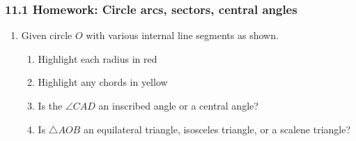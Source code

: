

\fancyhead[LE]{\thepage}



\subsubsection*{11.1 Homework: Circle arcs, sectors, central angles}
\begin{enumerate}
  \item Given circle $O$ with various internal line segments as shown.
  \begin{multicols}{2}
  \raggedcolumns
  \begin{enumerate}[itemsep=0.5cm]
    \item Highlight each radius in red
    \item Highlight any chords in yellow
    \item Is the $\angle CAD$ an inscribed angle or a central angle?
    \item Is $\triangle AOB$ an equilateral triangle, isosceles triangle, or a scalene triangle?
  \end{enumerate}
  \end{multicols}


\end{enumerate}
